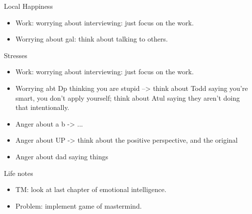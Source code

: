 \begin{frame}
  \begin{columns}
    \begin{column}{0.25\linewidth} %
      \begin{block}{Local Happiness}
        \begin{itemize}
          \tiny \item \tiny Work: worrying about interviewing: just focus on the work. 
        \item \tiny Worrying about gal: think about talking to others. 
        \end{itemize}
      \end{block}
      \begin{block}{Stresses}
        \begin{itemize}
          \tiny \item \tiny Work: worrying about interviewing: just focus on the work. 
        \item \tiny Worrying abt Dp thinking you are stupid -->  think
            about Todd saying you're smart, you don't apply yourself; 
            think about Atul saying they aren't doing that
            intentionally. 
          \item \tiny Anger about a b  -> ...
          \item \tiny Anger about UP -> think about the positive
            perspective, and the original
          \item \tiny Anger about dad saying things 
        \end{itemize}
      \end{block}    
      \begin{block}{Life notes}
        \begin{itemize}
        \item \tiny TM: look at last chapter of emotional
          intelligence.  
        \item \tiny Problem: implement game of mastermind. 
        \end{itemize}
      \end{block}
    \end{column} %


\end{columns}
\end{frame}
